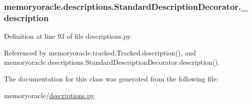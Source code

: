 \subsubsection[{\+\_\+description}]{\setlength{\rightskip}{0pt plus 5cm}memoryoracle.\+descriptions.\+Standard\+Description\+Decorator.\+\_\+description\hspace{0.3cm}{\ttfamily [private]}}\label{classmemoryoracle_1_1descriptions_1_1StandardDescriptionDecorator_ade25da7ba3aa70a22861cf7787b7a3e7}


Definition at line 93 of file descriptions.\+py.



Referenced by memoryoracle.\+tracked.\+Tracked.\+description(), and memoryoracle.\+descriptions.\+Standard\+Description\+Decorator.\+description().



The documentation for this class was generated from the following file\+:\begin{DoxyCompactItemize}
\item 
memoryoracle/\hyperlink{descriptions_8py}{descriptions.\+py}\end{DoxyCompactItemize}
